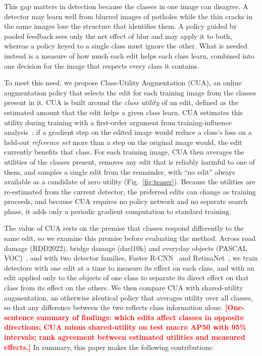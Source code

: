 \documentclass[conference]{IEEEtran}
\newcommand{\todo}[1]{\textcolor{red}{\textbf{[#1]}}}
\begin{document}
This gap matters in detection because the classes in one image can disagree. A detector may learn well from blurred images of potholes while the thin cracks in the same images lose the structure that identifies them. A policy guided by pooled feedback sees only the net effect of blur and may apply it to both, whereas a policy keyed to a single class must ignore the other. What is needed instead is a measure of how much each edit helps each class learn, combined into one decision for the image that respects every class it contains.

To meet this need, we propose Class-Utility Augmentation (CUA), an online augmentation policy that selects the edit for each training image from the classes present in it. CUA is built around the \emph{class utility} of an edit, defined as the estimated amount that the edit helps a given class learn. CUA estimates this utility during training with a first-order argument from training-influence analysis~\cite{pruthi2020tracin}: if a gradient step on the edited image would reduce a class's loss on a held-out \emph{reference set} more than a step on the original image would, the edit currently benefits that class. For each training image, CUA then averages the utilities of the classes present, removes any edit that is reliably harmful to one of them, and samples a single edit from the remainder, with ``no edit'' always available as a candidate of zero utility (Fig.~\ref{fig:teaser}). Because the utilities are re-estimated from the current detector, the preferred edits can change as training proceeds, and because CUA requires no policy network and no separate search phase, it adds only a periodic gradient computation to standard training.

The value of CUA rests on the premise that classes respond differently to the same edit, so we examine this premise before evaluating the method. Across road damage (RDD2022), bridge damage (dacl10k) and everyday objects (PASCAL VOC)~\cite{everingham2010voc}, and with two detector families, Faster R-CNN~\cite{ren2017faster} and RetinaNet~\cite{lin2017focal}, we train detectors with one edit at a time to measure its effect on each class, and with an edit applied only to the objects of one class to separate its direct effect on that class from its effect on the others. We then compare CUA with shared-utility augmentation, an otherwise identical policy that averages utility over all classes, so that any difference between the two reflects class information alone. \todo{One-sentence summary of findings: which edits affect classes in opposite directions; CUA minus shared-utility on test macro AP50 with 95\% intervals; rank agreement between estimated utilities and measured effects.} In summary, this paper makes the following contributions:
\end{document}

